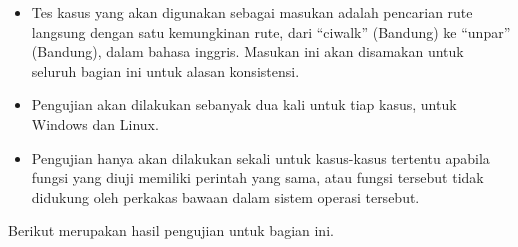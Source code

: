 \begin{itemize}
	\item Tes kasus yang akan digunakan sebagai masukan adalah pencarian rute langsung dengan satu kemungkinan rute, dari ``ciwalk'' (Bandung) ke ``unpar'' (Bandung), dalam bahasa inggris. Masukan ini akan disamakan untuk seluruh bagian ini untuk alasan konsistensi.
	\item Pengujian akan dilakukan sebanyak dua kali untuk tiap kasus, untuk Windows dan Linux.
	\item Pengujian hanya akan dilakukan sekali untuk kasus-kasus tertentu apabila fungsi yang diuji memiliki perintah yang sama, atau fungsi tersebut tidak didukung oleh perkakas \cl bawaan dalam sistem operasi tersebut.
\end{itemize}

Berikut merupakan hasil pengujian untuk bagian ini.

